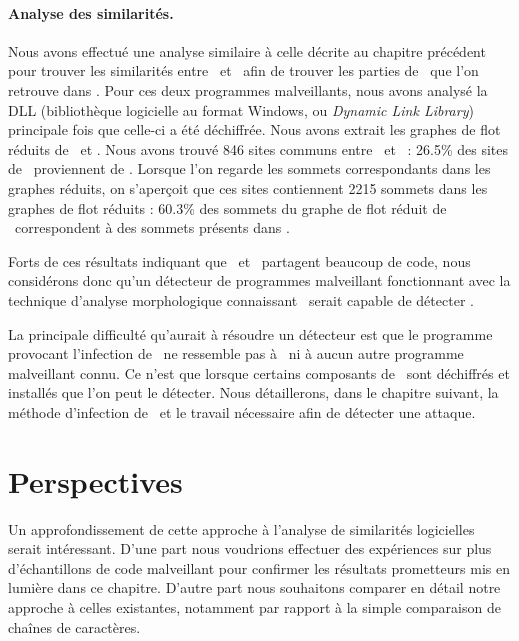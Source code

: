 \paragraph{Analyse des similarités.}
Nous avons effectué une analyse similaire à celle décrite au chapitre précédent pour trouver les similarités entre \stux\ et \duqu\ afin de trouver les parties de \stux\ que l'on retrouve dans \duqu.
Pour ces deux programmes malveillants, nous avons analysé la DLL (bibliothèque logicielle au format Windows, ou \emph{Dynamic Link Library}) principale fois que celle-ci a été déchiffrée.
Nous avons extrait les graphes de flot réduits de \duqu\ et \stux.
Nous avons trouvé 846 sites communs entre \duqu\ et \stux\ : 26.5\% des sites de \duqu\ proviennent de \stux.
Lorsque l'on regarde les sommets correspondants dans les graphes réduits, on s'aperçoit que ces sites contiennent 2215 sommets dans les graphes de flot réduits : 60.3\% des sommets du graphe de flot réduit de \duqu\ correspondent à des sommets  présents dans \stux.

Forts de ces résultats indiquant que \duqu\ et \stux\ partagent beaucoup de code, nous considérons donc qu'un détecteur de programmes malveillant fonctionnant avec la technique d'analyse morphologique connaissant \stux\ serait capable de détecter \duqu.

La principale difficulté qu'aurait à résoudre un détecteur est que le programme provocant l'infection de \duqu\ ne ressemble pas à \stux\ ni à aucun autre programme malveillant connu. Ce n'est que lorsque certains composants de \duqu\ sont déchiffrés et installés que l'on peut le détecter.
Nous détaillerons, dans le chapitre suivant, la méthode d'infection de \duqu\ et le travail nécessaire afin de détecter une attaque.


\section{Perspectives}
Un approfondissement de cette approche à l'analyse de similarités logicielles serait intéressant. D'une part nous voudrions effectuer des expériences sur plus d'échantillons de code malveillant pour confirmer les résultats prometteurs mis en lumière dans ce chapitre.
D'autre part nous souhaitons comparer en détail notre approche à celles existantes, notamment par rapport à la simple comparaison de chaînes de caractères.

